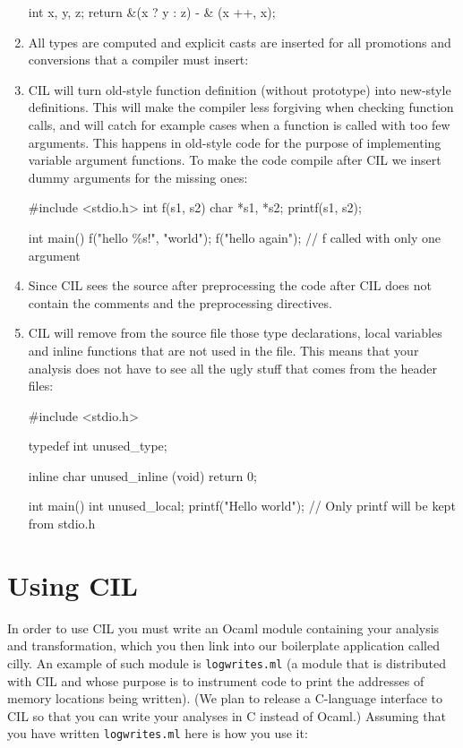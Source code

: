 \documentclass{article}
\def\t#1{{\tt #1}}
\begin{document}
\begin{enumerate}
\begin{cilcode}[local]
   int x, y, z;
   return &(x ? y : z) - & (x ++, x);
\end{cilcode}

\item All types are computed and explicit casts are inserted for all
promotions and conversions that a compiler must insert:

\item CIL will turn old-style function definition (without prototype) into
new-style definitions. This will make the compiler less forgiving when
checking function calls, and will catch for example cases when a function is
called with too few arguments. This happens in old-style code for the purpose
of implementing variable argument functions. To make the code compile after
CIL we insert dummy arguments for the missing ones:
\begin{cilcode}[global]
#include <stdio.h>
int f(s1, s2) char *s1, *s2; {
  printf(s1, s2);
}

int main() {
    f("hello \%s!\n", "world");
    f("hello again\n"); // f called with only one argument
}
\end{cilcode}
 
\item Since CIL sees the source after preprocessing the code after CIL does
not contain the comments and the preprocessing directives.

\item CIL will remove from the source file those type declarations, local
variables and inline functions that are not used in the file. This means that
your analysis does not have to see all the ugly stuff that comes from the
header files: 
\begin{cilcode}[global]
#include <stdio.h>

typedef int unused_type;

inline char unused_inline (void) { return 0; }

int main() {
  int unused_local;
  printf("Hello world\n"); // Only printf will be kept from stdio.h     
}
\end{cilcode}

\end{enumerate}

\section{Using CIL}\label{sec-cil}
 
 In order to use CIL you must write an Ocaml module containing your analysis
and transformation, which you then link into our boilerplate application
called cilly. An example of such module is \t{logwrites.ml} (a module that is
distributed with CIL and whose purpose is to instrument code to print the
addresses of memory locations being written). (We plan to release a C-language
interface to CIL so that you can write your analyses in C instead of Ocaml.)
Assuming that you have written \t{logwrites.ml} here is how you use it: 
\end{document}
